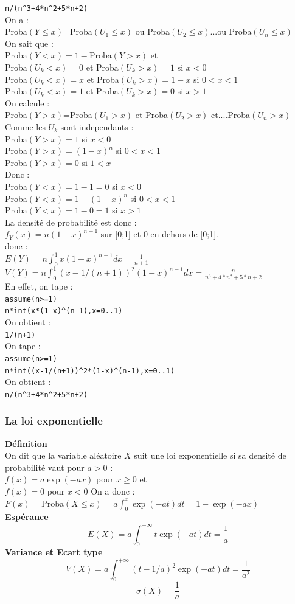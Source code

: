 \documentclass[a4paper,11pt]{book}
\begin{document}
{\tt n/(n\verb|^|3+4*n\verb|^|2+5*n+2)}\\
On a :\\
Proba$(Y\leq x)$=Proba$(U_1\leq x)$ ou Proba$(U_2\leq x)$...ou Proba$(U_n\leq x)$\\
On sait que :\\
Proba$(Y<x)=1-$Proba$(Y>x)$ et\\
Proba$(U_k<x)=0$ et Proba$(U_k>x)=1$ si $x<0$ \\
Proba$(U_k<x)=x$ et Proba$(U_k>x)=1-x$ si $0<x<1$\\
Proba$(U_k<x)=1$ et Proba$(U_k>x)=0$ si $x>1$ \\
On calcule :\\
 Proba$(Y>x)$=Proba$(U_1>x)$ et Proba$(U_2>x)$ et....Proba$(U_n>x)$\\
Comme les $U_k$ sont independants :\\
Proba$(Y>x)=1$ si $x<0$\\
Proba$(Y>x)=(1-x)^n$ si $0<x<1$\\
Proba$(Y>x)=0$ si $1<x$\\
Donc :\\
Proba$(Y<x)=1-1=0$ si $x<0$\\
Proba$(Y<x)=1-(1-x)^n$ si $0<x<1$\\
Proba$(Y<x)=1-0=1$ si $x>1$\\
La densit\'e de probabilit\'e est donc :\\
$f_Y(x)=n(1-x)^{n-1}$ sur [0;1] et 0 en dehors de [0;1].\\
 donc :\\
$\displaystyle E(Y)=n\int_0^1x(1-x)^{n-1}dx=\frac{1}{n+1}$\\
$\displaystyle V(Y)=n\int_0^1(x-1/(n+1))^2(1-x)^{n-1}dx=\frac{n}{n^3+4*n^2+5*n+2}$\\
En effet, on tape :\\
{\tt assume(n>=1)}\\
{\tt n*int(x*(1-x)\verb|^|(n-1),x=0..1)}\\
On obtient :\\
{\tt 1/(n+1)}\\
On tape :\\
{\tt assume(n>=1)}\\
{\tt n*int((x-1/(n+1))\verb|^|2*(1-x)\verb|^|(n-1),x=0..1)}\\
On obtient :\\
{\tt n/(n\verb|^|3+4*n\verb|^|2+5*n+2)}

\subsubsection{La loi exponentielle}
{\bf D\'efinition}\\
On dit que la variable al\'eatoire $X$ suit une loi exponentielle si sa 
densit\'e de probabilit\'e vaut  pour $a>0$ :\\
$f(x)=a\exp(-ax)$ pour $x\geq 0$ et\\
$f(x)=0$ pour $x<0$
On a donc :\\
$F(x)=$Proba$(X\leq x)=a\int_0^x\exp(-at)dt=1-\exp(-ax)$\\
{\bf Esp\'erance}
$$E(X)=a\int_0^{+\infty}t\exp(-at)dt=\frac{1}{a}$$
{\bf Variance et Ecart type}
$$V(X)=a\int_0^{+\infty}(t-1/a)^2\exp(-at)dt=\frac{1}{a^2}$$
$$\sigma(X)=\frac{1}{a}$$
\end{document}
